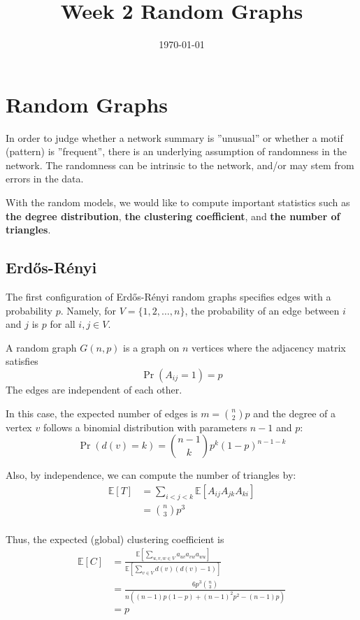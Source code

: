 \documentclass{article}
\title{Week 2 Random Graphs}
\date{\today}
\begin{document}
\maketitle

\section{Random Graphs}
In order to judge whether a network summary is ”unusual” or whether a motif (pattern) is ”frequent”, there is an underlying assumption of randomness in the network. The randomness can be intrinsic to the network, and/or may stem from errors in the data.  

With the random models, we would like to compute important statistics such as \textbf{the degree distribution}, \textbf{the clustering coefficient}, and \textbf{the number of triangles}.

\subsection{Erd\H{o}s-R\'{e}nyi}
The first configuration of Erd\H{o}s-R\'{e}nyi random graphs specifies edges with a probability $p$. Namely, for $V=\{1,2,\ldots,n\}$, the probability of an edge between $i$ and $j$ is $p$ for all $i,j\in V$.
\begin{definition}
    A random graph $G(n,p)$ is a graph on $n$ vertices where the adjacency matrix satisfies
    \begin{equation*}
        \Pr(A_{ij}=1)=p
    \end{equation*}
    The edges are independent of each other.
\end{definition}

In this case, the expected number of edges is $m=\binom{n}{2}p$ and the degree of a vertex $v$ follows a binomial distribution with parameters $n-1$ and $p$:
$$
\Pr(d(v)=k)=\binom{n-1}{k}p^k(1-p)^{n-1-k}
$$

Also, by independence, we can compute the number of triangles by:
\begin{align*}
    \mathbb{E}[T]&=\sum_{i<j<k} \mathbb{E}[A_{ij}A_{jk}A_{ki}]\\
    &=\binom{n}{3}p^3\\
\end{align*}

Thus, the expected (global) clustering coefficient is
\begin{align*}
    \mathbb{E}[C]&=\frac{\mathbb{E}[\sum_{u,v,w \in V} a_{uv}a_{vw}a_{wu}]}{\mathbb{E}[\sum_{v\in V} d(v)(d(v)-1)]} \\
    &= \frac{6p^3 \binom{n}{3}}{n ((n-1)p(1-p) + (n-1)^2p^2 -(n-1)p)}\\
    &=p
\end{align*}
\end{document}
